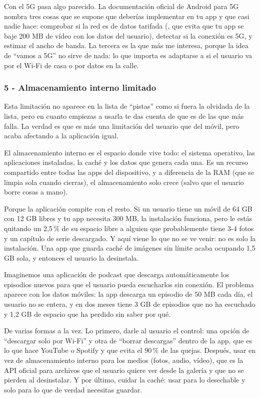 Con el 5G pasa algo parecido. La documentación oficial de Android para 5G nombra tres cosas que se supone que deberías implementar en tu app y que casi nadie hace: comprobar si la red es de datos tarifada (, que evita que tu app se baje 200 MB de vídeo con los datos del usuario), detectar si la conexión es 5G, y estimar el ancho de banda. La tercera es la que más me interesa, porque la idea de \enquote{vamos a 5G} no sirve de nada: lo que importa es adaptarse a si el usuario va por el Wi-Fi de casa o por datos en la calle.

\subsubsection*{5 - Almacenamiento interno limitado}

Esta limitación no aparece en la lista de \enquote{pistas} como si fuera la olvidada de la lista, pero en cuanto empiezas a usarla te das cuenta de que es de las que más falla. La verdad es que es más una limitación del usuario que del móvil, pero acaba afectando a la aplicación igual.

El almacenamiento interno es el espacio donde vive todo: el sistema operativo, las aplicaciones instaladas, la caché y los datos que genera cada una. Es un recurso compartido entre todas las apps del dispositivo, y a diferencia de la RAM (que se limpia sola cuando cierras), el almacenamiento solo crece (salvo que el usuario borre cosas a mano).

Porque la aplicación compite con el resto. Si un usuario tiene un móvil de 64 GB con 12 GB libres y tu app necesita 300 MB, la instalación funciona, pero le estás quitando un 2,5\,\% de su espacio libre a alguien que probablemente tiene 3-4 fotos y un capítulo de serie descargado. Y aquí viene lo que no se ve venir: no es solo la instalación. Una app que guarda caché de imágenes sin límite acaba ocupando 1,5 GB sola, y entonces el usuario la desinstala.

Imaginemos una aplicación de podcast que descarga automáticamente los episodios nuevos para que el usuario pueda escucharlos sin conexión. El problema aparece con los datos móviles: la app descarga un episodio de 50 MB cada día, el usuario no se entera, y en dos meses tiene 3 GB de episodios que no ha escuchado y 1,2 GB de espacio que ha perdido sin saber por qué.

De varias formas a la vez. Lo primero, darle al usuario el control: una opción de \enquote{descargar solo por Wi-Fi} y otra de \enquote{borrar descargas} dentro de la app, que es lo que hace YouTube o Spotify y que evita el 90\,\% de las quejas. Después, usar  en vez de almacenamiento interno para los medios (fotos, audio, vídeo), que es la API oficial para archivos que el usuario quiere ver desde la galería y que no se pierden al desinstalar. Y por último, cuidar la caché: usar  para lo desechable y  solo para lo que de verdad necesitas guardar.

